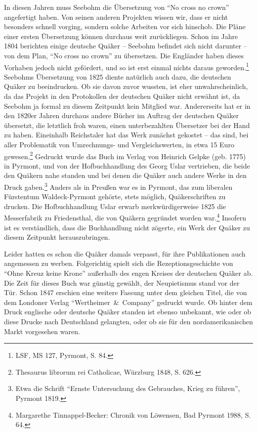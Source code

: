 In diesen Jahren muss Seebohm die Übersetzung von "`No cross no crown"'
angefertigt haben. Von seinen anderen Projekten wissen wir, dass er nicht
besonders schnell vorging, sondern solche Arbeiten vor sich hinschob. Die Pläne
einer ersten Übersetzung können durchaus weit zurückliegen. Schon im Jahre 1804
berichten einige deutsche Quäker -- Seebohm befindet sich nicht darunter -- von
dem Plan, "`No cross no crown"' zu übersetzen. Die Engländer haben dieses
Vorhaben jedoch nicht gefördert, und so ist erst einmal nichts daraus
geworden.\footnote{LSF, MS 127, Pyrmont, S. 84.} Seebohms Übersetzung von 1825
diente natürlich auch dazu, die deutschen Quäker zu beeindrucken. Ob sie davon
zuvor wussten, ist eher unwahrscheinlich, da das Projekt in den Protokollen der
deutschen Quäker nicht erwähnt ist, da Seebohm ja formal zu diesem Zeitpunkt
kein Mitglied war. Andererseits hat er in den 1820er Jahren durchaus andere
Bücher im Auftrag der deutschen Quäker übersetzt, die letztlich froh waren,
einen unterbezahlten Übersetzer bei der Hand zu haben. Eineinhalb Reichstaler
hat das Werk zunächst gekostet -- das sind, bei aller Problematik von
Umrechnungs- und Vergleichswerten, in etwa 15 Euro gewesen.\footnote{Thesaurus
librorum rei Catholicae, Würzburg 1848, S. 626.} Gedruckt wurde das Buch im
Verlag von Heinrich Gelpke (geb. 1775) in Pyrmont, und von der Hofbuchhandlung
des Georg Uslar vertrieben, die beide den Quäkern nahe standen und bei denen die
Quäker auch andere Werke in den Druck gaben.\footnote{Etwa die Schrift "`Ernste
Untersuchung des Gebrauches, Krieg zu führen"',
Pyrmont 1819.} Anders als in Preußen war es in
Pyrmont, das zum liberalen Fürstentum Waldeck-Pyrmont gehörte, stets möglich,
Quäkerschriften zu drucken. Die Hofbuchhandlung Uslar erwarb merkwürdigerweise
1825 die Messerfabrik zu Friedensthal, die von Quäkern gegründet worden
war.\footnote{Margarethe Tinnappel-Becker: Chronik von Löwensen, Bad Pyrmont
1988, S. 64.} Insofern ist es verständlich, dass die Buchhandlung nicht zögerte,
ein Werk der Quäker zu diesem Zeitpunkt herauszubringen.

\medskip

Leider hatten es schon die Quäker damals verpasst, für ihre Publikationen auch
angemessen zu werben. Folgerichtig spielt sich die Rezeptionsgeschichte von
"`Ohne Kreuz keine Krone"' außerhalb des engen Kreises der deutschen Quäker ab.
Die Zeit für dieses Buch war günstig gewählt, der Neupietismus stand vor der
Tür. Schon 1847 erschien eine weitere Fassung unter dem gleichen Titel, die von
dem Londoner Verlag "`Wertheimer~\&~Company"' gedruckt wurde. Ob hinter dem
Druck englische oder deutsche Quäker standen ist ebenso unbekannt, wie oder ob
diese Drucke nach Deutschland gelangten, oder ob sie für den nordamerikanischen
Markt vorgesehen waren.

